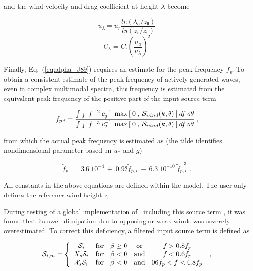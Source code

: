 \noindent
and the wind velocity and drag coefficient at height $\lambda$ become


\begin{equation}
u_{\lambda} = u_r \frac{ln(\lambda_a/z_0)}{ln(z_r/z_0)}
\label{eq:ul} \end{equation} \begin{equation}
C_{\lambda} = C_r \left ( \frac{u_a}{u_\lambda}
\right ) ^2 \label{eq:Cl}
\end{equation}

\noindent
Finally, Eq.~(\ref{eq:alpha_J89}) requires an estimate for the peak frequency
$f_p$. To obtain a consistent estimate of the peak frequency of actively
generated waves, even in complex multimodal spectra, this frequency is
estimated from the equivalent peak frequency of the positive part of the input
source term \citep[see][]{tol:JPO96}


\begin{equation}
f_{p,i} =
\frac { \int \int \: f^{-2} \: c_g^{-1} \:
\max \: [ \: 0 \:,\: {\cal S}_{wind}(k,\theta) \: ] \: d f \: d\theta }
{ \int \int \: f^{-3} \: c_g^{-1} \:
\max \: [ \: 0 \:,\: {\cal S}_{wind}(k,\theta) \: ] \: d f \: d\theta }
\: , \label{eq:fp_ir}
\end{equation}

\noindent
from which the actual peak frequency is estimated as (the tilde identifies
nondimensional parameter based on $u_\ast$ and $g$)


\begin{equation}
\tilde{f}_p \: = \: 3.6 \: 10^{-4} \: + \: 0.92 \tilde{f}_{p,i}
\: - \: 6.3 \: 10^{-10} \: \tilde{f}_{p,i}^{-3}
\:\: . \label{eq:fp_fpi} \end{equation}

\noindent
All constants in the above equations are defined within the model. The user
only defines the reference wind height $z_r$.

During testing of a global implementation of \ws\ including this source term
\citep{tol:OMB02a}, it was found that its swell dissipation due to opposing or
weak winds was severely overestimated. To correct this deficiency, a filtered
input source term is defined as


\begin{equation}
{\cal S}_{i,m} = \left \{ \begin{array}{ccccc}
    {\cal S}_i         & \mbox{for} & \beta \geq 0 & \mbox{or}  & f > 0.8 f_p \\
  X_s {\cal S}_i       & \mbox{for} & \beta < 0    & \mbox{and} & f < 0.6 f_p \\
{\cal{X}}_s {\cal S}_i & \mbox{for} & \beta < 0    & \mbox{and} & 06 f_p < f < 0.8 f_p
\end{array} \right . \: , \label{eq:swellf} \end{equation}

